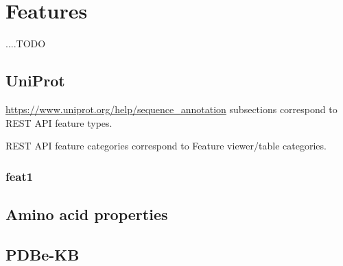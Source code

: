 
\chapter{Features}

....TODO

\section{UniProt}
\url{https://www.uniprot.org/help/sequence_annotation}
 subsections correspond to REST API feature types.
 
REST API feature categories correspond to Feature viewer/table categories.




\subsection{feat1}


\section{Amino acid properties}



\section{PDBe-KB}

